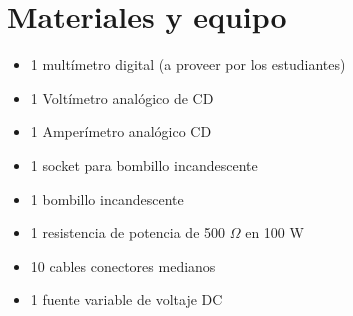 \documentclass{report}
\newcommand{\mat}{Materiales y equipo}
\begin{document}
\section{\mat}
\begin{itemize}
\item 1 multímetro digital (a proveer por los estudiantes)
\item 1 Voltímetro analógico de CD
\item 1 Amperímetro analógico CD
\item 1 socket para bombillo incandescente
\item 1 bombillo incandescente
\item 1 resistencia de potencia de 500 $\Omega$ en 100 \si{W}
\item 10 cables conectores medianos
\item 1 fuente variable de voltaje DC
\end{itemize}
\end{document}
